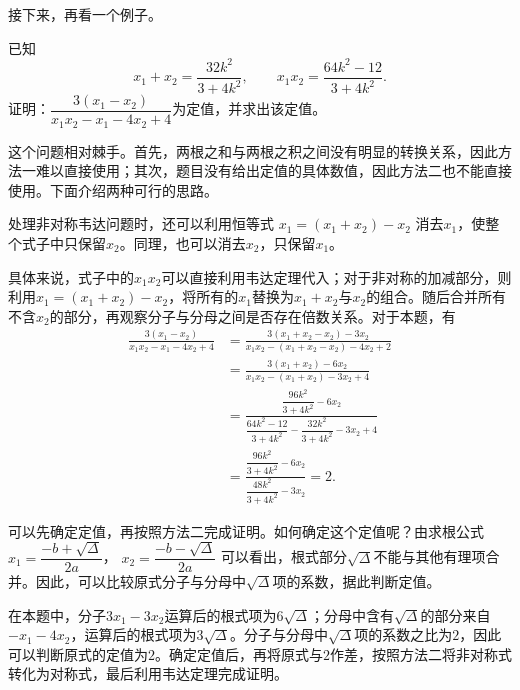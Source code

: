 接下来，再看一个例子。

\begin{tcolorbox}[
  enhanced,
  breakable,
  title={问题引入},
  colback=structurecolor!5,
  colframe=structurecolor,
  colbacktitle=structurecolor,
  coltitle=white,
  fonttitle=\bfseries,
  boxrule=0.5pt,
  arc=1mm,
  left=8pt,
  right=8pt,
  top=6pt,
  bottom=6pt
]
已知
\[
x_1+x_2=\frac{32k^2}{3+4k^2},
\qquad
x_1x_2=\frac{64k^2-12}{3+4k^2}.
\]
证明：$\dfrac{3(x_1-x_2)}{x_1x_2-x_1-4x_2+4}$为定值，并求出该定值。
\end{tcolorbox}

这个问题相对棘手。首先，两根之和与两根之积之间没有明显的转换关系，因此方法一难以直接使用；其次，题目没有给出定值的具体数值，因此方法二也不能直接使用。下面介绍两种可行的思路。

\medskip
{}

处理非对称韦达问题时，还可以利用恒等式
$x_1=(x_1+x_2)-x_2$
消去$x_1$，使整个式子中只保留$x_2$。同理，也可以消去$x_2$，只保留$x_1$。

具体来说，式子中的$x_1x_2$可以直接利用韦达定理代入；对于非对称的加减部分，则利用$x_1=(x_1+x_2)-x_2$，将所有的$x_1$替换为$x_1+x_2$与$x_2$的组合。随后合并所有不含$x_2$的部分，再观察分子与分母之间是否存在倍数关系。对于本题，有
\[
\begin{aligned}
\frac{3(x_1-x_2)}{x_1x_2-x_1-4x_2+4}
&=\frac{3(x_1+x_2-x_2)-3x_2}
{x_1x_2-(x_1+x_2-x_2)-4x_2+2}\\
&=\frac{3(x_1+x_2)-6x_2}
{x_1x_2-(x_1+x_2)-3x_2+4}\\
&=\frac{\dfrac{96k^2}{3+4k^2}-6x_2}
{\dfrac{64k^2-12}{3+4k^2}
-\dfrac{32k^2}{3+4k^2}-3x_2+4}\\
&=\frac{\dfrac{96k^2}{3+4k^2}-6x_2}
{\dfrac{48k^2}{3+4k^2}-3x_2}
=2.
\end{aligned}
\]


\medskip
{}

可以先确定定值，再按照方法二完成证明。如何确定这个定值呢？由求根公式
$x_1=\dfrac{-b+\sqrt{\Delta}}{2a}$，
$x_2=\dfrac{-b-\sqrt{\Delta}}{2a}$
可以看出，根式部分$\sqrt{\Delta}$不能与其他有理项合并。因此，可以比较原式分子与分母中$\sqrt{\Delta}$项的系数，据此判断定值。

在本题中，分子$3x_1-3x_2$运算后的根式项为$6\sqrt{\Delta}$；分母中含有$\sqrt{\Delta}$的部分来自$-x_1-4x_2$，运算后的根式项为$3\sqrt{\Delta}$。分子与分母中$\sqrt{\Delta}$项的系数之比为$2$，因此可以判断原式的定值为$2$。确定定值后，再将原式与$2$作差，按照方法二将非对称式转化为对称式，最后利用韦达定理完成证明。

